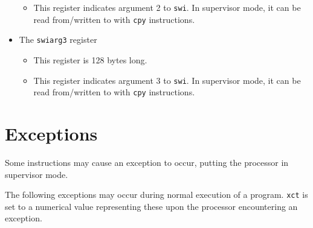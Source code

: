 \documentclass{article}
\begin{document}
\begin{itemize}
\begin{itemize}
		\item This register indicates argument 2 to \texttt{swi}. In
			supervisor mode, it can be read from/written to with
			\texttt{cpy} instructions.
		\end{itemize}
	\item The \texttt{swiarg3} register
		\begin{itemize}
		\item This register is 128 bytes long.
		\item This register indicates argument 3 to \texttt{swi}. In
			supervisor mode, it can be read from/written to with
			\texttt{cpy} instructions.
		\end{itemize}
	\end{itemize}
	\newpage
\section{Exceptions}
	Some instructions may cause an exception to occur, putting the
	processor in supervisor mode.

	The following exceptions may occur during normal execution of a
	program. \texttt{xct} is set to a numerical value representing these
	upon the processor encountering an exception. 
\end{document}
